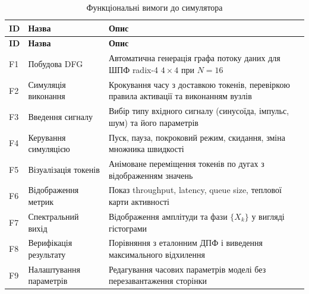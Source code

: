 \documentclass[
]{article}
\begin{document}
\begin{longtable}[]{@{}
  >{\raggedright\arraybackslash}p{}
  >{\raggedright\arraybackslash}p{}
  >{\raggedright\arraybackslash}p{}@{}}
\caption[Функціональні вимоги до симулятора]{Функціональні вимоги до
симулятора}\tabularnewline
\toprule\noalign{}
\begin{minipage}[b]{\linewidth}\raggedright
\textbf{ID}
\end{minipage} & \begin{minipage}[b]{\linewidth}\raggedright
\textbf{Назва}
\end{minipage} & \begin{minipage}[b]{\linewidth}\raggedright
\textbf{Опис}
\end{minipage} \\
\midrule\noalign{}
\endfirsthead
\toprule\noalign{}
\begin{minipage}[b]{\linewidth}\raggedright
\textbf{ID}
\end{minipage} & \begin{minipage}[b]{\linewidth}\raggedright
\textbf{Назва}
\end{minipage} & \begin{minipage}[b]{\linewidth}\raggedright
\textbf{Опис}
\end{minipage} \\
\midrule\noalign{}
\endhead
\bottomrule\noalign{}
\endlastfoot
F1 & Побудова DFG & Автоматична генерація графа потоку даних для ШПФ
radix-4 \(4 \times 4\) при \(N = 16\) \\
F2 & Симуляція виконання & Крокування часу з доставкою токенів,
перевіркою правила активації та виконанням вузлів \\
F3 & Введення сигналу & Вибір типу вхідного сигналу (синусоїда, імпульс,
шум) та його параметрів \\
F4 & Керування симуляцією & Пуск, пауза, покроковий режим, скидання,
зміна множника швидкості \\
F5 & Візуалізація токенів & Анімоване переміщення токенів по дугах з
відображенням значень \\
F6 & Відображення метрик & Показ throughput, latency, queue size,
теплової карти активності \\
F7 & Спектральний вихід & Відображення амплітуди та фази \(\{ X_{k}\}\)
у вигляді гістограми \\
F8 & Верифікація результату & Порівняння з еталонним ДПФ і виведення
максимального відхилення \\
F9 & Налаштування параметрів & Редагування часових параметрів моделі без
перезавантаження сторінки \\
\end{longtable}
\end{document}
